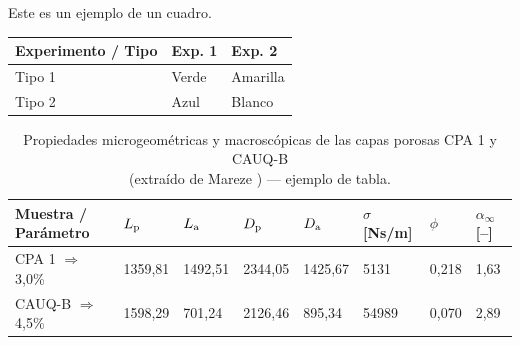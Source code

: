 \begin{cuadro}[ht!] %
  \centering {} \setlength\aboverulesep{0pt} \setlength\belowrulesep{0pt}
  \caption{Este es un ejemplo de un cuadro.}
    \fontsize{11}{12}\selectfont 
    \begin{tabular}{| C{2.8cm} | C{1.8cm} | C{1.8cm} |}
    \hline
    \textbf{ Experimento / Tipo } & \textbf{Exp. 1} & \textbf{Exp. 2}\\
	\midrule
		Tipo 1 & Verde & Amarilla\\
		 Tipo 2 & Azul & Blanco\\
	\hline
    \end{tabular}
    \label{quad.exemplo}%
    \vspace{2mm}
\end{cuadro}%


\begin{table}[!htb]
  \centering {} 
  \caption{Propiedades microgeométricas y macroscópicas de las capas porosas CPA 1 y CAUQ-B\\ (extraído de Mareze \etal \cite{Mareze-2017}) --- ejemplo de tabla.}
	\fontsize{11}{12}\selectfont 
    \begin{tabular}{C{2.9cm} | C{1.5cm} | C{1.5cm} | C{1.5cm} | C{1.5cm} | C{1.5cm} | C{1.0cm}| C{1.0cm}}
    \toprule
    \textbf{ Muestra / Parámetro } & $L_{\text{p}}$ \qquad [$\upmu$\! m] & $L_{\text{a}}$ \qquad [$\upmu$\! m] & $D_{\text{p}}$ \qquad [$\upmu$\! m] & $D_{\text{a}}$ \qquad [$\upmu$\! m] & $\sigma$ [Ns/m] & {$\phi$\quad [--]} & $\alpha_{\infty}$ [--]\\
	  \midrule
		CPA 1 $\Rightarrow$  3,0\% &	1359,81 & 1492,51 & 2344,05 & 1425,67 &	5131 &	0,218 &	1,63\\
		 CAUQ-B $\Rightarrow$ 4,5\%	& 1598,29 &	701,24 & 2126,46 & 895,34 &	54989 &	0,070 &	2,89\\
    \bottomrule
    \end{tabular}
    \label{tab.exemplo}%
\end{table}%




